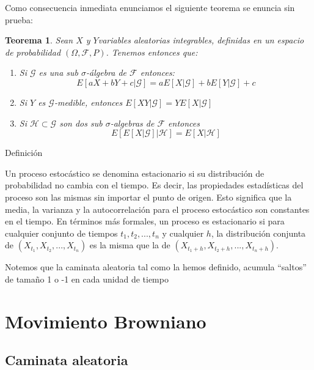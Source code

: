 \documentclass{extreport}
\theoremstyle{definicion}
\theoremstyle{propiedad}
\theoremstyle{teorema}
\newtheorem{teorema}{Teorema}[chapter]
\begin{document}
Como consecuencia inmediata enunciamos el siguiente teorema se enuncia sin prueba:
\begin{teorema}
Sean $X$ y $Y$variables  aleatorias integrables, definidas en un espacio de probabilidad $(\Omega, \mathcal{F},P)$.   Tenemos entonces que:
\begin{enumerate}
    \item Si $\mathcal{G}$ es una sub $\sigma$-álgebra de $\mathcal{F}$ entonces:
        $$
        E\left[a X + bY +c\vert \mathcal{G}\right] = aE\left[X\vert \mathcal{G}\right] +bE\left[Y\vert \mathcal{G}\right] +c
        $$
    \item Si $Y$ es $\mathcal{G}$-medible, entonces $E\left[XY\vert \mathcal{G}\right] = YE\left[X\vert \mathcal{G}\right]$  
    \item Si $\mathcal{H}\subset\mathcal{G}$ son dos sub $\sigma$-algebras de $\mathcal{F}$  entonces
        $$
        E\left[E\left[X\vert \mathcal{G}\right]\vert \mathcal{H}\right] = E\left[X\vert \mathcal{H}\right]
        $$    
\end{enumerate}



\end{teorema}





Definición

Un proceso estocástico se denomina estacionario si su distribución de probabilidad no cambia con el tiempo. Es decir, las propiedades estadísticas del proceso son las mismas sin importar el punto de origen. Esto significa que la media, la varianza y la autocorrelación para el proceso estocástico son constantes en el tiempo. En términos más formales, un proceso es estacionario si para cualquier conjunto de tiempos $t_1, t_2, ..., t_n$ y cualquier $h$, la distribución conjunta de $(X_{t_1}, X_{t_2}, ..., X_{t_n})$ es la misma que la de $(X_{t_1+h}, X_{t_2+h}, ..., X_{t_n+h})$.

Notemos que la caminata aleatoria tal como la hemos definido, acumula “saltos” de tamaño 1 o -1 en cada unidad de tiempo 

\chapter{Movimiento Browniano}
\section{Caminata aleatoria}
\end{document}
